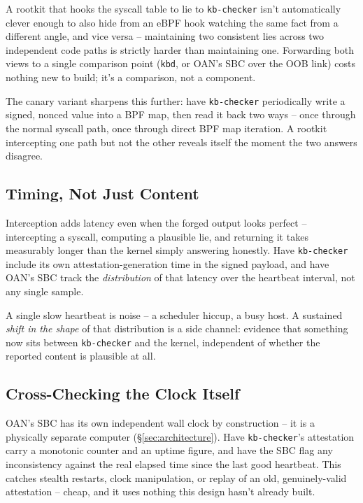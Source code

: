 \documentclass[11pt,a4paper]{article}
\begin{document}
A rootkit that hooks the syscall table to lie to \texttt{kb-checker}
isn't automatically clever enough to also hide from an eBPF hook
watching the same fact from a different angle, and vice versa --
maintaining two consistent lies across two independent code paths is
strictly harder than maintaining one. Forwarding both views to a
single comparison point (\texttt{kbd}, or OAN's SBC over the OOB link)
costs nothing new to build; it's a comparison, not a component.

The canary variant sharpens this further: have \texttt{kb-checker}
periodically write a signed, nonced value into a BPF map, then read it
back two ways -- once through the normal syscall path, once through
direct BPF map iteration. A rootkit intercepting one path but not the
other reveals itself the moment the two answers disagree.

\subsection{Timing, Not Just Content}
\label{sec:timing}

Interception adds latency even when the forged output looks perfect --
intercepting a syscall, computing a plausible lie, and returning it
takes measurably longer than the kernel simply answering honestly.
Have \texttt{kb-checker} include its own attestation-generation time
in the signed payload, and have OAN's SBC track the \emph{distribution}
of that latency over the heartbeat interval, not any single sample.

\begin{plainbox}
A single slow heartbeat is noise -- a scheduler hiccup, a busy host.
A sustained \emph{shift in the shape} of that distribution is a side
channel: evidence that something now sits between \texttt{kb-checker}
and the kernel, independent of whether the reported content is
plausible at all.
\end{plainbox}

\subsection{Cross-Checking the Clock Itself}
\label{sec:clock-crosscheck}

OAN's SBC has its own independent wall clock by construction -- it is
a physically separate computer (\S\ref{sec:architecture}). Have
\texttt{kb-checker}'s attestation carry a monotonic counter and an
uptime figure, and have the SBC flag any inconsistency against the
real elapsed time since the last good heartbeat. This catches stealth
restarts, clock manipulation, or replay of an old, genuinely-valid
attestation -- cheap, and it uses nothing this design hasn't already
built.
\end{document}
